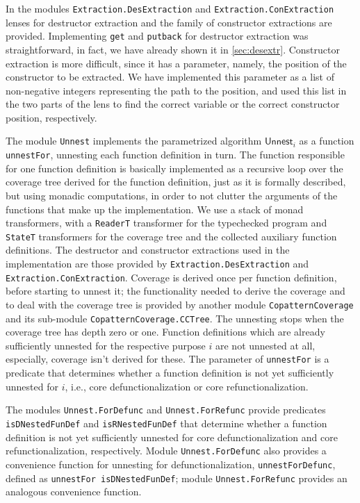 In the modules \texttt{Extraction.DesExtraction} and \texttt{Extraction.ConExtraction} lenses for  destructor extraction and the family of constructor extractions are provided. Implementing \texttt{get} and \texttt{putback} for destructor extraction was straightforward, in fact, we have already shown it in \autoref{sec:desextr}. Constructor extraction is more difficult, since it has a parameter, namely, the position of the constructor to be extracted. We have implemented this parameter as a list of non-negative integers representing the path to the position, and used this list in the two parts of the lens to find the correct variable or the correct constructor position, respectively.

The module \texttt{Unnest} implements the parametrized algorithm $\textsf{Unnest}_i$ as a function \texttt{unnestFor}, unnesting each function definition in turn. The function responsible for one function definition is basically implemented as a recursive loop over the coverage tree derived for the function definition, just as it is formally described, but using monadic computations, in order to not clutter the arguments of the functions that make up the implementation. We use a stack of monad transformers, with a \texttt{ReaderT} transformer for the typechecked program and \texttt{StateT} transformers for the coverage tree and the collected auxiliary function definitions. The destructor and constructor extractions used in the implementation are those provided by \texttt{Extraction.DesExtraction} and \texttt{Extraction.ConExtraction}. Coverage is derived once per function definition, before starting to unnest it; the functionality needed to derive the coverage and to deal with the coverage tree is provided by another module \texttt{CopatternCoverage} and its sub-module \texttt{CopatternCoverage.CCTree}. The unnesting stops when the coverage tree has depth zero or one. Function definitions which are already sufficiently unnested for the respective purpose $i$ are not unnested at all, especially, coverage isn't derived for these. The parameter of \texttt{unnestFor} is a predicate that determines whether a function definition is not yet sufficiently unnested for $i$, i.e., core defunctionalization or core refunctionalization.

The modules \texttt{Unnest.ForDefunc} and \texttt{Unnest.ForRefunc} provide predicates \texttt{isDNestedFunDef} and \texttt{isRNestedFunDef} that determine whether a function definition is not yet sufficiently unnested for core defunctionalization and core refunctionalization, respectively. Module \texttt{Unnest.ForDefunc} also provides a convenience function for unnesting for defunctionalization, \texttt{unnestForDefunc}, defined as \texttt{unnestFor isDNestedFunDef}; module \texttt{Unnest.ForRefunc} provides an analogous convenience function.

